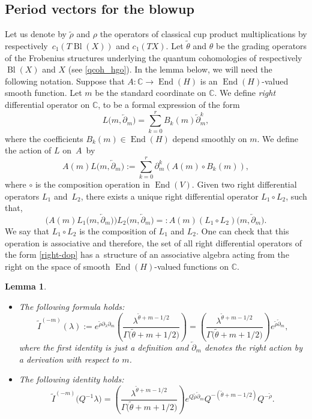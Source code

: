 \documentclass[10pt,a4paper]{article}
\numberwithin{equation}{section}
\newtheorem{Lemma}[Theorem]{Lemma}
\newcommand{\CC}{\mathbb{C}}
\newcommand{\op}{\operatorname}
\begin{document}
\subsection{Period vectors for the blowup}
Let us denote
by $\widetilde{\rho}$ and $\rho$ the operators of classical cup product
multiplications by respectively~$c_1(T\operatorname{Bl}(X))$ and
$c_1(TX)$. Let $\widetilde{\theta}$ and $\theta$ be the grading
operators of the Frobenius structures underlying the quantum
cohomologies of respectively $\operatorname{Bl}(X)$ and $X$ (see
\eqref{qcoh_hgo}). In the lemma below, we will need the following
notation. Suppose that $A\colon\CC\to \op{End}(H)$ is
an $\op{End}(H)$-valued smooth function. Let $m$ be the standard
coordinate on $\CC$. We define {\em right} differential operator on
$\CC$, to be a formal expression of the form
\begin{equation}\label{right-dop}
L\big(m,\overleftarrow{\partial}_m\big)=
\sum_{k=0}^r B_k(m)
\overleftarrow{\partial}_m^k,
\end{equation}
where the coefficients $B_k(m)\in
\op{End}(H)$ depend smoothly on $m$. We define the action of
$L$ on~$A$~by
\[
A(m) L\big(m,\overleftarrow{\partial}_m\big) := \sum_{k=0}^r \partial_m^k (
 A(m) \circ B_k(m)  ),
\]
where $\circ$ is the composition operation in $\op{End}(V)$. Given two right
differential operators $L_1$ and~$L_2$, there exists a unique right
differential operator $L_1\circ L_2$, such that,
\[
\big(A(m) L_1\big(m,\overleftarrow{\partial}_m\big)\big)
L_2\big(m,\overleftarrow{\partial}_m\big) =:
A(m) (L_1\circ L_2)\big(m,\overleftarrow{\partial}_m\big).
\]
We say that $L_1\circ L_2$ is the composition of $L_1$ and $L_2$. One
can check that this operation is associative and therefore, the set of
all right differential operators of the form \eqref{right-dop} has
a~structure of an associative algebra acting from the right on the
space of smooth $\op{End}(H)$-valued functions on $\CC$.
\begin{Lemma}\label{le:cp-homog}\quad
\begin{itemize}\itemsep=0pt
\item[$(a)$] The following formula holds:
\[
\widetilde{I}^{(-m)}(\lambda) :=
e^{\widetilde{\rho}\partial_\lambda\partial_m}
\left(
\frac{\lambda^{\widetilde{\theta}+m-1/2}}{
\Gamma\big(\widetilde{\theta}+m+1/2\big)} \right) =
\left(
\frac{\lambda^{\widetilde{\theta}+m-1/2}}{
\Gamma\big(\widetilde{\theta}+m+1/2\big)} \right)
e^{\widetilde{\rho} \overleftarrow{\partial}_m},
\]
where the first identity is just a definition and $\overleftarrow{\partial}_m$
denotes the right action by a derivation with respect to $m$.
\item[$(b)$]
The following identity holds:
\[
\widetilde{I}^{(-m)}\big(Q^{-1}\lambda\big) =
\left(
\frac{\lambda^{\widetilde{\theta}+m-1/2}}{
\Gamma\big(\widetilde{\theta}+m+1/2\big)}
\right)
e^{Q\widetilde{\rho} \overleftarrow{\partial}_m}
Q^{-(\widetilde{\theta}+m-1/2)}
Q^{-\widetilde{\rho}}.
\]
\end{itemize}
\end{Lemma}
\end{document}
